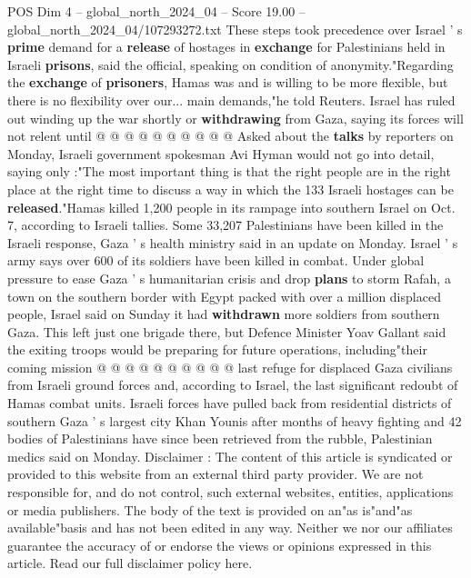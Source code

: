 \begin{textsample}{POS Dim 4 – global\_north\_2024\_04 – Score 19.00 – global\_north\_2024\_04/107293272.txt}
These steps took precedence over Israel ' s \textbf{prime} demand for a \textbf{release} of hostages in \textbf{exchange} for Palestinians held in Israeli \textbf{prisons}, said the official, speaking on condition of anonymity."Regarding the \textbf{exchange} of \textbf{prisoners}, Hamas was and is willing to be more flexible, but there is no flexibility over our... main demands,"he told Reuters.
Israel has ruled out winding up the war shortly or \textbf{withdrawing} from Gaza, saying its forces will not relent until @ @ @ @ @ @ @ @ @ @ Asked about the \textbf{talks} by reporters on Monday, Israeli government spokesman Avi Hyman would not go into detail, saying only :"The most important thing is that the right people are in the right place at the right time to discuss a way in which the 133 Israeli hostages can be \textbf{released}."Hamas killed 1,200 people in its rampage into southern Israel on Oct. 7, according to Israeli tallies.
Some 33,207 Palestinians have been killed in the Israeli response, Gaza ' s health ministry said in an update on Monday.
Israel ' s army says over 600 of its soldiers have been killed in combat.
Under global pressure to ease Gaza ' s humanitarian crisis and drop \textbf{plans} to storm Rafah, a town on the southern border with Egypt packed with over a million displaced people, Israel said on Sunday it had \textbf{withdrawn} more soldiers from southern Gaza.
This left just one brigade there, but Defence Minister Yoav Gallant said the exiting troops would be preparing for future operations, including"their coming mission @ @ @ @ @ @ @ @ @ @ last refuge for displaced Gaza civilians from Israeli ground forces and, according to Israel, the last significant redoubt of Hamas combat units.
Israeli forces have pulled back from residential districts of southern Gaza ' s largest city Khan Younis after months of heavy fighting and 42 bodies of Palestinians have since been retrieved from the rubble, Palestinian medics said on Monday.
Disclaimer : The content of this article is syndicated or provided to this website from an external third party provider.
We are not responsible for, and do not control, such external websites, entities, applications or media publishers.
The body of the text is provided on an"as is"and"as available"basis and has not been edited in any way.
Neither we nor our affiliates guarantee the accuracy of or endorse the views or opinions expressed in this article.
Read our full disclaimer policy here.

\end{textsample}
